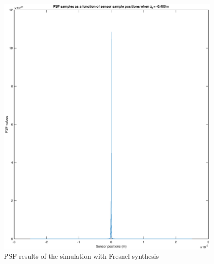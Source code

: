 \documentclass[12pt,a4paper,english
]{tunithesis}
\begin{document}
\begin{figure}
  \centering
  \includegraphics[width=\columnwidth]{img/psf_single_fresnel.eps}
  \caption{PSF results of the simulation with Fresnel synthesis}
  \label{fig:psf_single_fresnel}
\end{figure}
\end{document}
